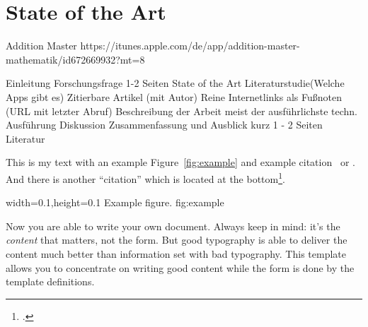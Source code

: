 
\chapter{State of the Art}
\label{chap:sota}

Addition Master https://itunes.apple.com/de/app/addition-master-mathematik/id672669932?mt=8

Einleitung
	Forschungsfrage 1-2 Seiten
State of the Art
	Literaturstudie(Welche Apps gibt es)
	Zitierbare Artikel (mit Autor)
	Reine Internetlinks als Fußnoten (URL mit letzter Abruf) 
Beschreibung der Arbeit
	meist der ausführlichste
	techn. Ausführung
Diskussion
Zusammenfassung und Ausblick
	kurz 1 - 2 Seiten
Literatur



This is my text with an example Figure~\ref{fig:example} and example
citation~\cite{StrunkWhite} or \textcite{Bringhurst1993}. And there is another
\enquote{citation} which is located at the bottom\footcite{tagstore}.

  {width=0.1\textwidth,height=0.1\textheight}%
  {Example figure.}%
  {}%
  {fig:example}%

Now you are able to write your own document. Always keep in mind: it's
the \emph{content} that matters, not the form. But good typography is
able to deliver the content much better than information set with bad
typography. This template allows you to concentrate on writing good
content while the form is done by the template definitions.



